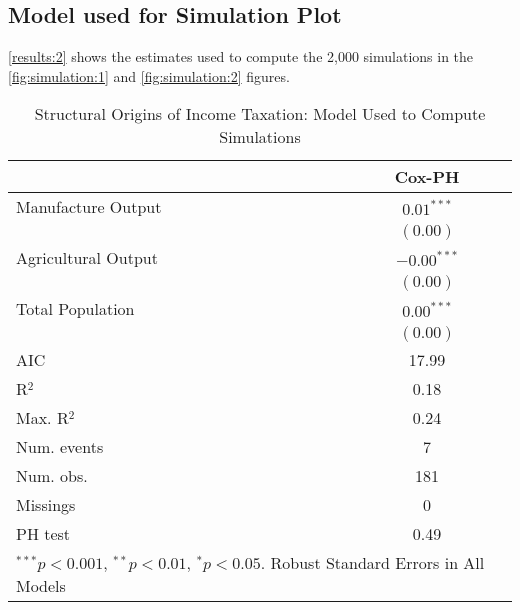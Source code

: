 \documentclass[onesided]{article}\usepackage[]{graphicx}\usepackage[]{color}
\begin{document}
\subsection{Model used for Simulation Plot}

\autoref{results:2} shows the estimates used to compute the 2,000 simulations in the \autoref{fig:simulation:1} and \autoref{fig:simulation:2} figures.


\begin{table}[h]
\begin{center}
\begin{scriptsize}
\begin{tabular}{l c }
\hline
 & Cox-PH \\
\hline
Manufacture Output  & $0.01^{***}$  \\
                    & $(0.00)$      \\
Agricultural Output & $-0.00^{***}$ \\
                    & $(0.00)$      \\
Total Population    & $0.00^{***}$  \\
                    & $(0.00)$      \\
\hline
AIC                 & 17.99         \\
R$^2$               & 0.18          \\
Max. R$^2$          & 0.24          \\
Num. events         & 7             \\
Num. obs.           & 181           \\
Missings            & 0             \\
PH test             & 0.49          \\
\hline
\multicolumn{2}{l}{\tiny{$^{***}p<0.001$, $^{**}p<0.01$, $^*p<0.05$. Robust Standard Errors in All Models}}
\end{tabular}
\end{scriptsize}
\caption{Structural Origins of Income Taxation: Model Used to Compute Simulations}
\label{results:2}
\end{center}
\end{table}



\newpage



\end{document}
